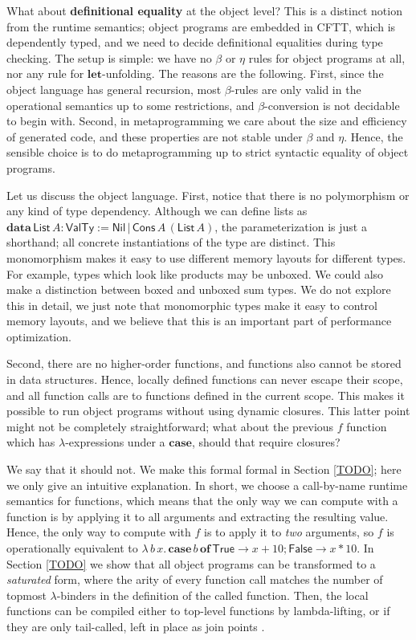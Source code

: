 \documentclass[acmsmall,screen,review,anonymous]{acmart}
\newcommand{\msf}[1]{\mathsf{#1}}
\newcommand{\mbf}[1]{\mathbf{#1}}
\newcommand{\lam}{\lambda\,}
\newcommand{\data}{\mbf{data}\,}
\newcommand{\of}{\mbf{of}\,}
\newcommand{\List}{\msf{List}}
\newcommand{\Nil}{\msf{Nil}}
\newcommand{\Cons}{\msf{Cons}}
\newcommand{\case}{\mbf{case\,}}
\newcommand{\VTy}{\msf{ValTy}}
\newcommand{\True}{\msf{True}}
\newcommand{\False}{\msf{False}}
\theoremstyle{remark}
\begin{document}
What about \textbf{definitional equality} at the object level? This is a
distinct notion from the runtime semantics; object programs are embedded in
CFTT, which is dependently typed, and we need to decide definitional equalities
during type checking. The setup is simple: we have no $\beta$ or $\eta$ rules
for object programs at all, nor any rule for $\mbf{let}$-unfolding. The reasons
are the following. First, since the object language has general recursion, most
$\beta$-rules are only valid in the operational semantics up to some
restrictions, and $\beta$-conversion is not decidable to begin with. Second, in
metaprogramming we care about the size and efficiency of generated code, and
these properties are not stable under $\beta$ and $\eta$.  Hence, the sensible
choice is to do metaprogramming up to strict syntactic equality of object
programs.

Let us discuss the object language. First, notice that there is no polymorphism
or any kind of type dependency. Although we can define lists as $\data \List\,A
: \VTy := \Nil\,|\,\Cons\,A\,(\List\,A)$, the parameterization is just a
shorthand; all concrete instantiations of the type are distinct. This
monomorphism makes it easy to use different memory layouts for different types.
For example, types which look like products may be unboxed. We could also make a
distinction between boxed and unboxed sum types. We do not explore this in
detail, we just note that monomorphic types make it easy to control memory
layouts, and we believe that this is an important part of performance
optimization.

Second, there are no higher-order functions, and functions also cannot be stored
in data structures. Hence, locally defined functions can never escape their
scope, and all function calls are to functions defined in the current
scope. This makes it possible to run object programs without using dynamic
closures. This latter point might not be completely straightforward; what
about the previous $f$ function which has $\lambda$-expressions under a
$\mbf{case}$, should that require closures?

We say that it should not. We make this formal formal in Section \ref{TODO};
here we only give an intuitive explanation. In short, we choose a call-by-name
runtime semantics for functions, which means that the only way we can compute
with a function is by applying it to all arguments and extracting the resulting
value.  Hence, the only way to compute with $f$ is to apply it to \emph{two}
arguments, so $f$ is operationally equivalent to $\lam b\,x.\,\case b\,\of \True
\to x + 10; \False \to x * 10$.  In Section \ref{TODO} we show that all object
programs can be transformed to a \emph{saturated} form, where the arity of every
function call matches the number of topmost $\lambda$-binders in the definition
of the called function. Then, the local functions can be compiled either to
top-level functions by lambda-lifting, or if they are only tail-called, left in
place as join points \cite{TODO}.
\end{document}
